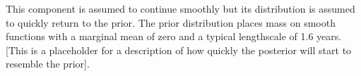 This component is assumed to continue smoothly but its distribution is assumed to quickly return to the prior.
The prior distribution places mass on smooth functions with a marginal mean of zero and a typical lengthscale of 1.6 years.
[This is a placeholder for a description of how quickly the posterior will start to resemble the prior].